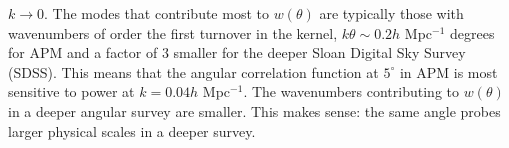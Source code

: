 \documentclass[12pt,a4paper]{article}
\begin{document}
$k \rightarrow 0$. The modes that contribute most to $w(\theta)$ are typically those with wavenumbers of order the first turnover in the kernel, $k \theta \sim 0.2 h$ Mpc$^{-1}$ degrees for APM and a factor of $3$ smaller for the deeper Sloan Digital Sky Survey (SDSS). This means that the angular correlation function at $5^\circ$ in APM is most sensitive to power at $k = 0.04 h$ Mpc$^{-1}$. The wavenumbers contributing to $w(\theta)$ in a deeper angular survey are smaller. This makes sense: the same angle probes larger physical scales in a deeper survey. 

 



 



\cite{2008cosm.book.....W}






















\end{document}
